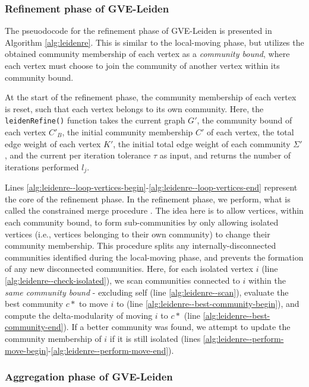 \subsubsection{Refinement phase of GVE-Leiden}

The pseuodocode for the refinement phase of GVE-Leiden is presented in Algorithm \ref{alg:leidenre}. This is similar to the local-moving phase, but utilizes the obtained community membership of each vertex as a \textit{community bound}, where each vertex must choose to join the community of another vertex within its community bound. At the start of the refinement phase, the community membership of each vertex is reset, such that each vertex belongs to its own community. Here, the \texttt{leidenRefine()} function takes the current graph $G'$, the community bound of each vertex $C'_B$, the initial community membership $C'$ of each vertex, the total edge weight of each vertex $K'$, the initial total edge weight of each community $\Sigma'$, and the current per iteration tolerance $\tau$ as input, and returns the number of iterations performed $l_j$.

Lines \ref{alg:leidenre--loop-vertices-begin}-\ref{alg:leidenre--loop-vertices-end} represent the core of the refinement phase. In the refinement phase, we perform, what is called the constrained merge procedure \cite{com-traag19}. The idea here is to allow vertices, within each community bound, to form sub-communities by only allowing isolated vertices (i.e., vertices belonging to their own community) to change their community membership. This procedure splits any internally-disconnected communities identified during the local-moving phase, and prevents the formation of any new disconnected communities. Here, for each isolated vertex $i$ (line \ref{alg:leidenre--check-isolated}), we scan communities connected to $i$ within the \textit{same community bound} - excluding self (line \ref{alg:leidenre--scan}), evaluate the best community $c*$ to move $i$ to (line \ref{alg:leidenre--best-community-begin}), and compute the delta-modularity of moving $i$ to $c*$ (line \ref{alg:leidenre--best-community-end}). If a better community was found, we attempt to update the community membership of $i$ if it is still isolated (lines \ref{alg:leidenre--perform-move-begin}-\ref{alg:leidenre--perform-move-end}).


\subsubsection{Aggregation phase of GVE-Leiden}

